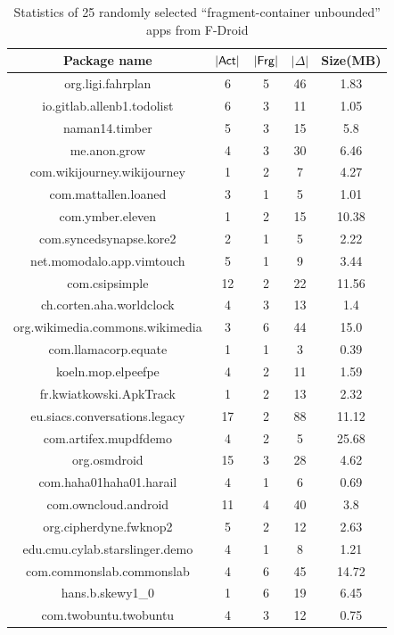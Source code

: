\begin{table}[htbp] 
	\begin{center}   
		\begin{tabular}{|c|c|c|c|c|}   
			\hline    \textbf{Package name} &\textbf{$|{\sf Act}|$} & \textbf{$|{\sf Frg}|$} & \textbf{$|\Delta|$} & \textbf{Size(MB)} \\   
			\hline
			\hline    org.ligi.fahrplan & 6& 5& 46& 1.83  \\ 
			\hline     io.gitlab.allenb1.todolist & 6& 3& 11& 1.05  \\ 
			\hline     naman14.timber & 5& 3& 15& 5.8  \\ 
			\hline     me.anon.grow & 4& 3& 30& 6.46  \\ 
			\hline    com.wikijourney.wikijourney & 1& 2& 7& 4.27  \\ 
			\hline     com.mattallen.loaned & 3& 1& 5& 1.01  \\ 
			\hline   com.ymber.eleven & 1& 2& 15& 10.38  \\ 
			\hline    com.syncedsynapse.kore2 &2& 1& 5& 2.22  \\ 
			\hline     net.momodalo.app.vimtouch & 5& 1& 9& 3.44  \\ 
			\hline     com.csipsimple & 12& 2& 22& 11.56  \\ 
			\hline    ch.corten.aha.worldclock & 4& 3& 13& 1.4  \\ 
			\hline     org.wikimedia.commons.wikimedia & 3& 6& 44& 15.0  \\ 
			\hline     com.llamacorp.equate & 1& 1& 3& 0.39  \\ 
			\hline     koeln.mop.elpeefpe & 4& 2& 11& 1.59  \\ 
			\hline     fr.kwiatkowski.ApkTrack & 1& 2& 13& 2.32  \\ 
			\hline   eu.siacs.conversations.legacy & 17& 2& 88& 11.12  \\ 
			\hline     com.artifex.mupdfdemo & 4& 2& 5& 25.68  \\ 
			\hline     org.osmdroid  & 15& 3& 28& 4.62  \\ 
			\hline     com.haha01haha01.harail & 4& 1& 6& 0.69   \\ 
			\hline     com.owncloud.android & 11& 4& 40& 3.8  \\ 
			\hline     org.cipherdyne.fwknop2 & 5& 2& 12& 2.63  \\ 
			\hline    edu.cmu.cylab.starslinger.demo & 4& 1& 8& 1.21  \\ 
			\hline     com.commonslab.commonslab & 4& 6& 45& 14.72  \\ 
			\hline     hans.b.skewy1\_0 & 1& 6& 19& 6.45  \\ 
			\hline     com.twobuntu.twobuntu & 4& 3& 12& 0.75  \\ 
             \hline   
\end{tabular}   
\caption{Statistics of 25 randomly selected ``fragment-container unbounded'' apps from F-Droid \label{tab:fc-unb-rand-fd} }
\end{center}   
\end{table}
